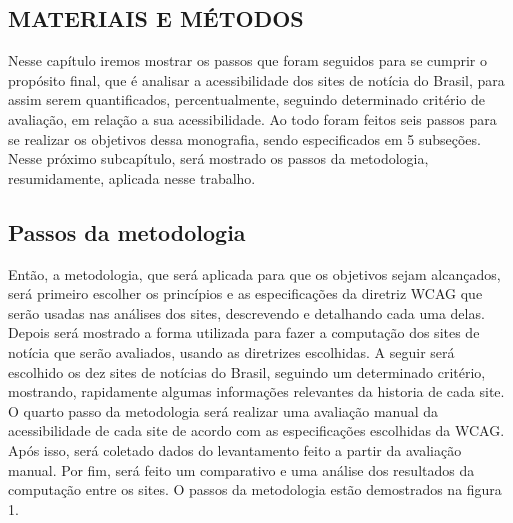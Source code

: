 \documentclass[a4paper]{article}
\begin{document}
\begin{titlepage}
\section{MATERIAIS E MÉTODOS}

Nesse capítulo iremos mostrar os passos que foram seguidos para se cumprir o propósito final, que é analisar a acessibilidade dos sites de notícia do Brasil, para assim serem quantificados, percentualmente, seguindo determinado critério de avaliação, em relação a sua acessibilidade. Ao todo foram feitos seis passos para se realizar os objetivos dessa monografia, sendo especificados em 5 subseções. Nesse próximo subcapítulo, será mostrado os passos da metodologia, resumidamente, aplicada nesse trabalho. 

\subsection{Passos da metodologia}

Então, a metodologia, que será aplicada para que os objetivos sejam alcançados, 
será primeiro escolher os princípios e as especificações da diretriz WCAG que serão usadas nas análises dos sites, descrevendo e detalhando cada uma delas. 
Depois será mostrado a forma utilizada para fazer a computação dos sites de notícia que serão avaliados, usando as diretrizes escolhidas. 
A seguir será escolhido os dez sites de notícias do Brasil, seguindo um determinado critério, mostrando, rapidamente algumas informações relevantes da historia de cada site. 
O quarto passo da metodologia será realizar uma avaliação manual da acessibilidade de cada site de acordo com as especificações escolhidas da WCAG. Após isso, será coletado dados do levantamento feito a partir da avaliação manual. Por fim, será feito um comparativo e uma análise dos resultados da computação entre os sites. O passos da metodologia estão demostrados na figura 1.\\


\end{titlepage}
\end{document}
